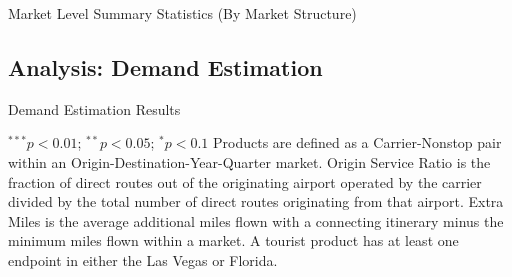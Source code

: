 \documentclass{article}
\begin{document}
        \begin{table}
        \caption{Market Level Summary Statistics (By Market Structure)}
        \label{fig:Market_Type_Summary}
                  \vspace{-15mm}
        \begin{center}
        
        \end{center}
    \end{table}


    \FloatBarrier

    \subsection{Analysis: Demand Estimation}
    \begin{table}
        \caption{Demand Estimation Results}
        \label{tab:DemandEst}
        \vspace{-15mm}
        \begin{center}
           
        \end{center}
        \vspace{-5mm}
                \footnotesize{$^{***}p<0.01$; $^{**}p<0.05$; $^{*}p<0.1$ Products are defined as a Carrier-Nonstop pair within an Origin-Destination-Year-Quarter market. Origin Service Ratio is the fraction of direct routes out of the originating airport operated by the carrier divided by the total number of direct routes originating from that airport. Extra Miles is the average additional miles flown with a connecting itinerary minus the minimum miles flown within a market.  A tourist product has at least one endpoint in either the Las Vegas or Florida.}
    \end{table}
\end{document}
